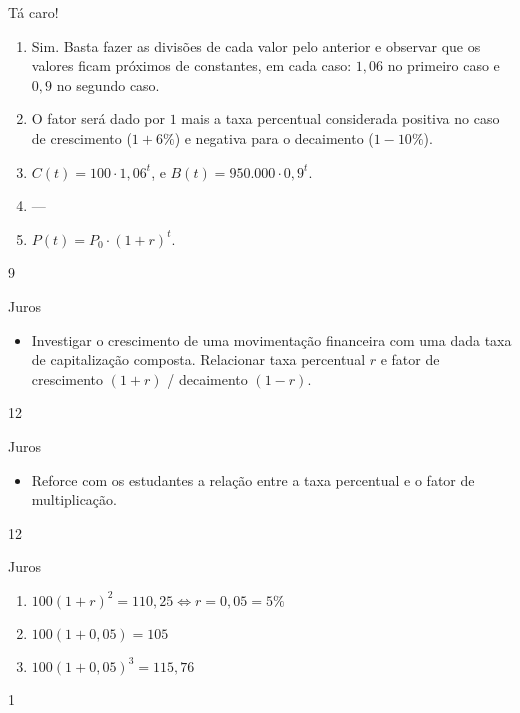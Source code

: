 \begin{answer}{Tá caro!}
{\begin{enumerate}
	\item{}
	Sim. Basta fazer as divisões de cada valor pelo anterior e observar que os valores ficam próximos de constantes, em cada caso: $1,06$ no primeiro caso e $0,9$ no segundo caso.

	\item{}
	O fator será dado por $1$ mais a taxa percentual considerada positiva no caso de crescimento ($1+6\%$) e negativa para o decaimento ($1-10\%$).

	\item{}
	$C(t)=100\cdot1,06^{t}$, e $B(t)=950.000\cdot0,9^t$.

	\item{}
	---
	\item{}
	$P(t)=P_0\cdot(1+r)^t$.

	\end{enumerate}
}{9}
\end{answer}
\clearmargin
\begin{objectives}{Juros}
{
\begin{itemize}
\item Investigar o crescimento de uma movimentação financeira com uma dada taxa de capitalização composta. Relacionar taxa percentual $r$ e fator de crescimento $(1+r)$ / decaimento $(1 - r)$.
\end{itemize}
}{1}{2}
\end{objectives}
\begin{sugestions}{Juros}
{
\begin{itemize}
\item Reforce com os estudantes a relação entre a taxa percentual e o fator de multiplicação.
\end{itemize}
}{1}{2}
\end{sugestions}
\begin{answer}{Juros}
{
\begin{enumerate}

\item{}
$100(1+r)^2 =110,25 \iff r=0,05 = 5\%$ 

\item{}
$100(1+0,05)=105$

\item{}
$100(1+0,05)^3=115,76$

\end{enumerate}
}{1}
\end{answer}


